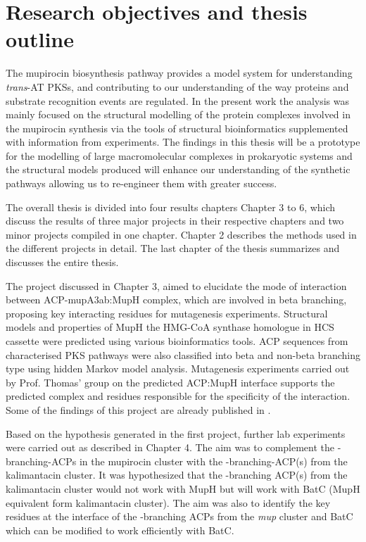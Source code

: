 	\section{Research objectives and thesis outline}
	\label{sec:researchobjectives}
	The mupirocin biosynthesis pathway provides a model system for understanding \textit{trans}-AT PKSs, and contributing to our understanding of the way proteins and substrate recognition events are regulated. In the present work the analysis was mainly focused on the structural modelling of the protein complexes involved in the mupirocin synthesis via the tools of structural bioinformatics supplemented with information from experiments. The findings in this thesis will be a prototype for the modelling of large macromolecular complexes in prokaryotic systems and the structural models produced will enhance our understanding of the synthetic pathways allowing us to re-engineer them with greater success. 
	
	The overall thesis is divided into four results chapters Chapter 3 to 6, which discuss the results of three major projects in their respective chapters and two minor projects compiled in one chapter. Chapter 2 describes the methods used in the different projects in detail. The last chapter of the thesis summarizes and discusses the entire thesis. 
	
	The project discussed in Chapter 3, aimed to elucidate the mode of interaction between ACP-mupA3ab:MupH complex, which are involved in beta branching, proposing key interacting residues for mutagenesis experiments. Structural models and properties of MupH the HMG-CoA synthase homologue in HCS cassette were predicted using various bioinformatics tools. ACP sequences from characterised PKS pathways were also classified into beta and non-beta branching type using hidden Markov model analysis. Mutagenesis experiments carried out by Prof. Thomas' group on the predicted ACP:MupH interface supports the predicted complex and residues responsible for the specificity of the interaction. Some of the findings of this project are already published in \textcite{Haines2013}.
	
	Based on the hypothesis generated in the first project, further lab experiments were carried out as described in Chapter 4. The aim was to complement the \bet-branching-ACPs in the mupirocin cluster with the \bet-branching-ACP(s) from the kalimantacin cluster. It was hypothesized that the \bet-branching ACP(s) from the kalimantacin cluster would not work with MupH but will work with BatC (MupH equivalent form kalimantacin cluster). The aim was also to identify the key residues at the interface of the \bet-branching ACPs from the \textit{mup} cluster and BatC which can be modified to work efficiently with BatC.
	
